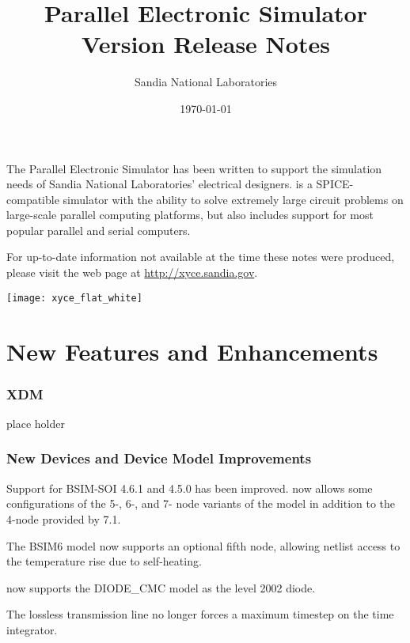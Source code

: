 \documentclass[letterpaper]{scrartcl}
\title{\XyceTitle{} Parallel Electronic Simulator\\
Version \XyceVersionVar{} Release Notes}
\author{ Sandia National Laboratories}
\date{\today}
\begin{document}
\maketitle

The \XyceTM{} Parallel Electronic Simulator has been written to support the
simulation needs of Sandia National Laboratories' electrical designers.
\XyceTM{} is a SPICE-compatible simulator with the ability to solve extremely
large circuit problems on large-scale parallel computing platforms, but also
includes support for most popular parallel and serial computers.

For up-to-date information not available at the time these notes were produced,
please visit the \XyceTM{} web page at
{\color{XyceDeepRed}\url{http://xyce.sandia.gov}}.

\tableofcontents
\vspace*{\fill}
\parbox{\textwidth}
{
  \hfill
  \texttt{[image: xyce\_flat\_white]}
}


\newpage
\section{New Features and Enhancements}

\subsubsection*{XDM}
\begin{XyceItemize}
  \item place holder
\end{XyceItemize}

\subsubsection*{New Devices and Device Model Improvements}
\begin{XyceItemize}
  \item Support for BSIM-SOI 4.6.1 and 4.5.0 has been improved.  \Xyce{}
    now allows some configurations of the 5-, 6-, and 7- node variants
    of the model in addition to the 4-node provided by \Xyce{} 7.1.
  \item The BSIM6 model now supports an optional fifth node, allowing
    netlist access to the temperature rise due to self-heating.
  \item \Xyce{} now supports the DIODE\_CMC model as the level 2002 diode.
  \item The lossless transmission line no longer forces a maximum
    timestep on the time integrator.
\end{XyceItemize}
\end{document}
